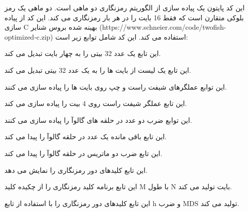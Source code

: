 \begin{boxK}
    \lr{
        
    }
\end{boxK}


\begin{boxK}
    \lr{
        
    }
\end{boxK}

\begin{boxB}
    این کد پایتون یک پیاده سازی از الگوریتم رمزنگاری دو ماهی است. دو ماهی یک رمز بلوکی متقارن است که فقط 16 بایت را در هر بار رمزنگاری می کند. این کد از پیاده سازی C بهینه شده بروس شنایر (https://www.schneier.com/code/twofish-optimized-c.zip) استفاده می کند. این کد شامل توابع زیر است:

 
این تابع یک عدد 32 بیتی را به چهار بایت تبدیل می کند.
 
 
 این تابع یک لیست از بایت ها را به یک عدد 32 بیتی تبدیل می کند.

 
 این توابع عملگرهای شیفت راست و چپ روی بایت ها را پیاده سازی می کنند.
 
 
این تابع عملگر شیفت راست روی 4 بیت را پیاده سازی می کند.

 
 این توابع ضرب دو عدد در حلقه های گالوآ را پیاده
 سازی می کنند.


این تابع باقی مانده یک عدد در حلقه گالوآ را پیدا می کند.


این تابع ضرب دو ماتریس در حلقه گالوآ را پیدا می کند.


این تابع کلیدهای دور رمزنگاری را نمایش می دهد.


این تابع برنامه کلید رمزنگاری را از چکیده کلید M با طول N بایت تولید می کند.


این تابع کلیدهای دور رمزنگاری را با استفاده از تابع h و ضرب MDS تولید می کند.



\end{boxB}
